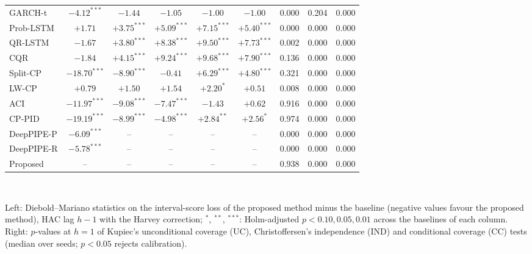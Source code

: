 \begin{table}[!t]
\begin{tabular}{lcccccccc}
GARCH-t & $-4.12^{***}$ & $-1.44$ & $-1.05$ & $-1.00$ & $-1.00$ & 0.000 & 0.204 & 0.000\\
Prob-LSTM & $+1.71$ & $+3.75^{***}$ & $+5.09^{***}$ & $+7.15^{***}$ & $+5.40^{***}$ & 0.000 & 0.000 & 0.000\\
QR-LSTM & $-1.67$ & $+3.80^{***}$ & $+8.38^{***}$ & $+9.50^{***}$ & $+7.73^{***}$ & 0.002 & 0.000 & 0.000\\
CQR & $-1.84$ & $+4.15^{***}$ & $+9.24^{***}$ & $+9.68^{***}$ & $+7.90^{***}$ & 0.136 & 0.000 & 0.000\\
Split-CP & $-18.70^{***}$ & $-8.90^{***}$ & $-0.41$ & $+6.29^{***}$ & $+4.80^{***}$ & 0.321 & 0.000 & 0.000\\
LW-CP & $+0.79$ & $+1.50$ & $+1.54$ & $+2.20^{*}$ & $+0.51$ & 0.008 & 0.000 & 0.000\\
ACI & $-11.97^{***}$ & $-9.08^{***}$ & $-7.47^{***}$ & $-1.43$ & $+0.62$ & 0.916 & 0.000 & 0.000\\
CP-PID & $-19.19^{***}$ & $-8.99^{***}$ & $-4.98^{***}$ & $+2.84^{**}$ & $+2.56^{*}$ & 0.974 & 0.000 & 0.000\\
DeepPIPE-P & $-6.09^{***}$ & -- & -- & -- & -- & 0.000 & 0.000 & 0.000\\
DeepPIPE-R & $-5.78^{***}$ & -- & -- & -- & -- & 0.000 & 0.000 & 0.000\\
Proposed & -- & -- & -- & -- & -- & 0.938 & 0.000 & 0.000\\
\bottomrule\end{tabular}\\[4pt]
\parbox{\linewidth}{\scriptsize Left: Diebold--Mariano statistics on the interval-score loss of the proposed method minus the baseline (negative values favour the proposed method), HAC lag $h-1$ with the Harvey correction; $^{*}$, $^{**}$, $^{***}$: Holm-adjusted $p<0.10, 0.05, 0.01$ across the baselines of each column. Right: $p$-values at $h=1$ of Kupiec's unconditional coverage (UC), Christoffersen's independence (IND) and conditional coverage (CC) tests (median over seeds; $p<0.05$ rejects calibration).}
\end{table}